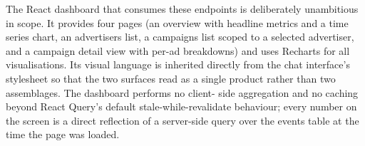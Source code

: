 The React dashboard that consumes these endpoints is deliberately
unambitious in scope. It provides four pages (an overview with
headline metrics and a time series chart, an advertisers list, a
campaigns list scoped to a selected advertiser, and a campaign detail
view with per-ad breakdowns) and uses Recharts for all
visualisations. Its visual language is inherited directly from the
chat interface's stylesheet so that the two surfaces read as a single
product rather than two assemblages. The dashboard performs no client-
side aggregation and no caching beyond React Query's default
stale-while-revalidate behaviour; every number on the screen is a
direct reflection of a server-side query over the events table at the
time the page was loaded.